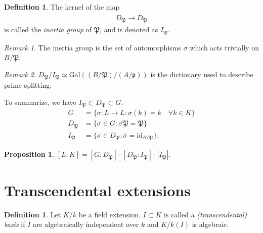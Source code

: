 \documentclass[12pt]{report}
\theoremstyle{plain}
\newtheorem{proposition}[theorem]{Proposition}
\theoremstyle{remark}
\newtheorem*{remark}{Remark}
\theoremstyle{definition}
\newtheorem{definition}[theorem]{Definition}
\begin{document}
\begin{definition}
    The kernel of the map
    \begin{align*}
        D_\mathfrak{P} \to \overline{D}_{\mathfrak{P}}
    \end{align*}
    is called the \emph{inertia group} of $\mathfrak{P}$, and is denoted as $I_\mathfrak{P}$.
\end{definition}
\begin{remark}
    The inertia group is the set of automorphisms $\sigma$ which acts trivially on $B/\mathfrak{P}$.
\end{remark}
\begin{remark}
    $D_\mathfrak{P}/I_\mathfrak{P}\simeq \mathrm{Gal}((B/\mathfrak{P})/(A/\mathfrak{p}))$ is the dictionary used to describe prime splitting.
\end{remark}

To summarize, we have $I_\mathfrak{P}\subset D_\mathfrak{P}\subset G$.
\begin{align*}
    G &= \{\sigma:L\to L:\sigma(k)=k\quad\forall k\in K\} \\
    D_\mathfrak{P} &= \{\sigma\in G: \sigma\mathfrak{P}=\mathfrak{P}\} \\
    I_\mathfrak{P} &= \{\sigma\in D_\mathfrak{P}:\overline{\sigma}=\mathrm{id}_{B/\mathfrak{P}}\}.
\end{align*}

\begin{proposition}
    $[L:K]=[G:D_\mathfrak{P}] \cdot [D_{\mathfrak{P}}:I_\mathfrak{P}] \cdot |I_\mathfrak{P}|$.
\end{proposition}


\clearpage
\section{Transcendental extensions}
\begin{definition}
    Let $K/k$ be a field extension. $I\subset K$ is called a \emph{(transcendental) basis} if $I$ are algebraically independent over $k$ and $K/k(I)$ is algebraic.
\end{definition}
\end{document}
